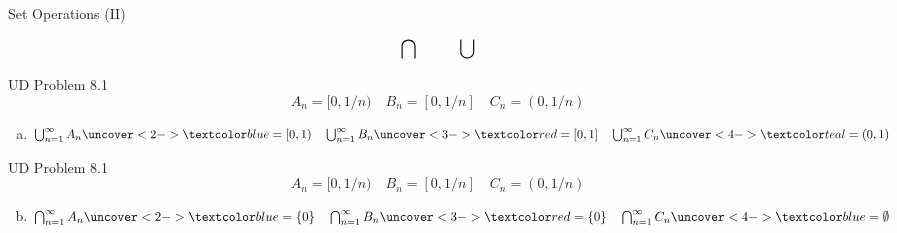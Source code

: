 
\begin{frame}{}
  \begin{center}
    {\Large Set Operations (II)}
  \end{center}

  \[
    \text{\Large $\bigcap \qquad \bigcup$}
  \]
\end{frame}

\begin{frame}{}
  \begin{exampleblock}{UD Problem 8.1}
    \[
      A_n = [0, 1/n) \quad B_n = [0, 1/n] \quad C_n = (0, 1/n)
    \]

    \begin{enumerate}[(a)]
      \item $\bigcup_{n=1}^{\infty} A_n \uncover<2->{\blue{\;= [0,1)}}
	\quad \bigcup_{n=1}^{\infty} B_n \uncover<3->{\red{\;= [0, 1]}} 
	\quad \bigcup_{n=1}^{\infty} C_n \uncover<4->{\teal{\;= (0, 1)}}$
    \end{enumerate}
  \end{exampleblock}
\end{frame}

\begin{frame}{}
  \begin{exampleblock}{UD Problem 8.1}
    \[
      A_n = [0, 1/n) \quad B_n = [0, 1/n] \quad C_n = (0, 1/n)
    \]

    \begin{enumerate}[(a)]
      \setcounter{enumi}{1}
      \item $\bigcap_{n=1}^{\infty} A_n \uncover<2->{\blue{\;= \set{0}}}
	\quad \bigcap_{n=1}^{\infty} B_n \uncover<3->{\red{\;= \set{0}}} 
	\quad \bigcap_{n=1}^{\infty} C_n \uncover<4->{\blue{\;= \emptyset}}$
    \end{enumerate}
  \end{exampleblock}

\end{frame}

